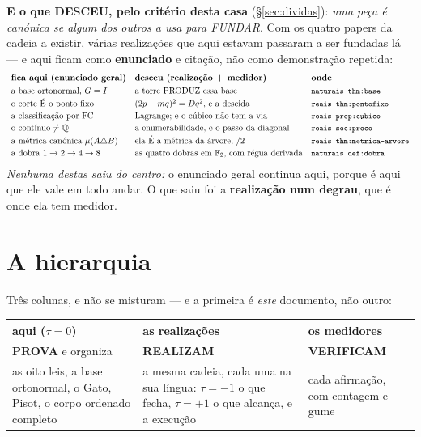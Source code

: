 \documentclass[11pt,a4paper]{article}
\newcommand{\code}[1]{\texttt{\small #1}}
\begin{document}
\medskip\noindent\textbf{E o que DESCEU, pelo critério desta casa}
(\S\ref{sec:dividas}): \emph{uma peça é canónica se algum dos outros a usa para
FUNDAR}. Com os quatro papers da cadeia a existir, várias realizações que aqui
estavam passaram a ser fundadas lá --- e aqui ficam como \textbf{enunciado} e
citação, não como demonstração repetida:
\[
\begin{array}{lll}
\textbf{fica aqui (enunciado geral)} & \textbf{desceu (realização + medidor)} & \textbf{onde}\\[3pt]
\text{a base ortonormal, }G=I & \text{a torre PRODUZ essa base} & \code{naturais thm:base}\\[2pt]
\text{o corte É o ponto fixo} & (2p-mq)^2=Dq^2\text{, e a descida} & \code{reais thm:pontofixo}\\[2pt]
\text{a classificação por FC} & \text{Lagrange; e o cúbico não tem a via} & \code{reais prop:cubico}\\[2pt]
\text{o contínuo}\neq\mathbb{Q} & \text{a enumerabilidade, e o passo da diagonal} & \code{reais sec:preco}\\[2pt]
\text{a métrica canónica }\mu(A\triangle B) & \text{ela É a métrica da árvore, }/2 & \code{reais thm:metrica-arvore}\\[2pt]
\text{a dobra }1\to2\to4\to8 & \text{as quatro dobras em }\mathbb{F}_2\text{, com régua derivada} & \code{naturais def:dobra}
\end{array}
\]
\noindent\emph{Nenhuma destas saiu do centro:} o enunciado geral continua aqui,
porque é aqui que ele vale em todo andar. O que saiu foi a \textbf{realização
num degrau}, que é onde ela tem medidor.

\section{A hierarquia}\label{sec:hier}

Três colunas, e não se misturam --- e a primeira é \emph{este} documento, não outro:
\begin{center}
\begin{tabular}{@{}p{4.4cm}p{4.4cm}p{5.4cm}@{}}
\toprule
\textbf{aqui} ($\tau=0$) & as realizações & os medidores \\
\midrule
\textbf{PROVA} e organiza & \textbf{REALIZAM} & \textbf{VERIFICAM} \\
as oito leis, a base ortonormal, o Gato, Pisot, o corpo ordenado completo
 & a mesma cadeia, cada uma na sua língua: $\tau=-1$ o que fecha, $\tau=+1$ o que
alcança, e a execução
 & cada afirmação, com contagem e gume \\
\bottomrule
\end{tabular}
\end{center}
\end{document}
